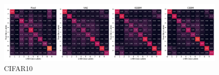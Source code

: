 \vspace*{-1em}
\begin{figure}[!h]
\centering
\vspace*{-2ex}
\includegraphics[width=\linewidth]{figures/confusion_matrix_14row_cifar10.pdf}
\vspace*{-6ex}
\caption{CIFAR10}
\label{appendix:confusion-matrices-cifar10}
\end{figure}

% 

